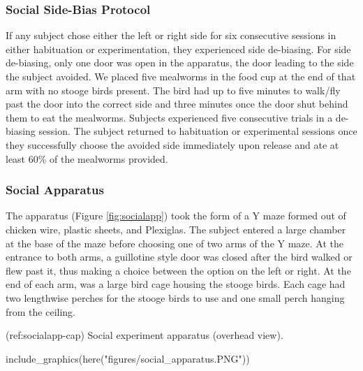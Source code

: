 \documentclass[
]{article}
\newenvironment{Shaded}{\begin{snugshade}}{\end{snugshade}}
\newcommand{\FunctionTok}[1]{\textcolor[rgb]{0.00,0.00,0.00}{#1}}
\newcommand{\NormalTok}[1]{#1}
\newcommand{\StringTok}[1]{\textcolor[rgb]{0.31,0.60,0.02}{#1}}
\begin{document}
\hypertarget{social-side-bias-protocol}{%
\subsubsection{Social Side-Bias
Protocol}\label{social-side-bias-protocol}}

If any subject chose either the left or right side for six consecutive
sessions in either habituation or experimentation, they experienced side
de-biasing. For side de-biasing, only one door was open in the
apparatus, the door leading to the side the subject avoided. We placed
five mealworms in the food cup at the end of that arm with no stooge
birds present. The bird had up to five minutes to walk/fly past the door
into the correct side and three minutes once the door shut behind them
to eat the mealworms. Subjects experienced five consecutive trials in a
de-biasing session. The subject returned to habituation or experimental
sessions once they successfully choose the avoided side immediately upon
release and ate at least 60\% of the mealworms provided.

\hypertarget{social-apparatus}{%
\subsubsection{Social Apparatus}\label{social-apparatus}}

The apparatus (Figure \ref{fig:socialapp}) took the form of a Y maze
formed out of chicken wire, plastic sheets, and Plexiglas. The subject
entered a large chamber at the base of the maze before choosing one of
two arms of the Y maze. At the entrance to both arms, a guillotine style
door was closed after the bird walked or flew past it, thus making a
choice between the option on the left or right. At the end of each arm,
was a large bird cage housing the stooge birds. Each cage had two
lengthwise perches for the stooge birds to use and one small perch
hanging from the ceiling.

(ref:socialapp-cap) Social experiment apparatus (overhead view).

\begin{Shaded}
\begin{Highlighting}[]
\FunctionTok{include\_graphics}\NormalTok{(}\FunctionTok{here}\NormalTok{(}\StringTok{"figures/social\_apparatus.PNG"}\NormalTok{))}
\end{Highlighting}
\end{Shaded}
\end{document}
